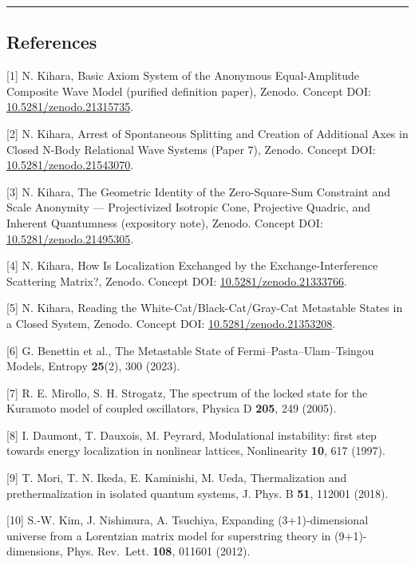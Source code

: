 \documentclass[
  a4paper,
]{article}
\begin{document}
\begin{center}\rule{0.5\linewidth}{0.5pt}\end{center}

\subsection{References}\label{references}

{[}1{]} N. Kihara, Basic Axiom System of the Anonymous Equal-Amplitude
Composite Wave Model (purified definition paper), Zenodo. Concept DOI:
\href{https://doi.org/10.5281/zenodo.21315735}{10.5281/zenodo.21315735}.

{[}2{]} N. Kihara, Arrest of Spontaneous Splitting and Creation of
Additional Axes in Closed N-Body Relational Wave Systems (Paper 7),
Zenodo. Concept DOI:
\href{https://doi.org/10.5281/zenodo.21543070}{10.5281/zenodo.21543070}.

{[}3{]} N. Kihara, The Geometric Identity of the Zero-Square-Sum
Constraint and Scale Anonymity --- Projectivized Isotropic Cone,
Projective Quadric, and Inherent Quantumness (expository note), Zenodo.
Concept DOI:
\href{https://doi.org/10.5281/zenodo.21495305}{10.5281/zenodo.21495305}.

{[}4{]} N. Kihara, How Is Localization Exchanged by the
Exchange-Interference Scattering Matrix?, Zenodo. Concept DOI:
\href{https://doi.org/10.5281/zenodo.21333766}{10.5281/zenodo.21333766}.

{[}5{]} N. Kihara, Reading the White-Cat/Black-Cat/Gray-Cat Metastable
States in a Closed System, Zenodo. Concept DOI:
\href{https://doi.org/10.5281/zenodo.21353208}{10.5281/zenodo.21353208}.

{[}6{]} G. Benettin et al., The Metastable State of
Fermi--Pasta--Ulam--Tsingou Models, Entropy \textbf{25}(2), 300 (2023).

{[}7{]} R. E. Mirollo, S. H. Strogatz, The spectrum of the locked state
for the Kuramoto model of coupled oscillators, Physica D \textbf{205},
249 (2005).

{[}8{]} I. Daumont, T. Dauxois, M. Peyrard, Modulational instability:
first step towards energy localization in nonlinear lattices,
Nonlinearity \textbf{10}, 617 (1997).

{[}9{]} T. Mori, T. N. Ikeda, E. Kaminishi, M. Ueda, Thermalization and
prethermalization in isolated quantum systems, J. Phys. B \textbf{51},
112001 (2018).

{[}10{]} S.-W. Kim, J. Nishimura, A. Tsuchiya, Expanding
(3+1)-dimensional universe from a Lorentzian matrix model for
superstring theory in (9+1)-dimensions, Phys. Rev.~Lett. \textbf{108},
011601 (2012).
\end{document}
